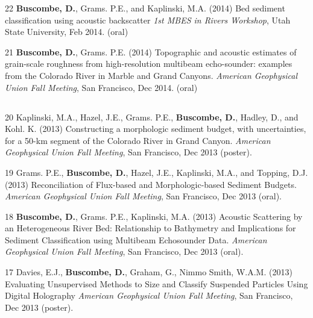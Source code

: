 \documentclass[margin,line]{resume}
\begin{document}
\begin{resume}
\begin{footnotesize}
\begin{list1}
        \item[22] {\bf Buscombe, D.}, Grams. P.E., and Kaplinski, M.A. (2014) Bed sediment classification using acoustic backscatter {\sl 1st MBES in Rivers Workshop}, Utah State University, Feb 2014. (oral)\\

        \item[21] {\bf Buscombe, D.}, Grams. P.E. (2014) Topographic and acoustic estimates of grain-scale roughness from high-resolution multibeam echo-sounder: examples from the Colorado River in Marble and Grand Canyons. {\sl American Geophysical Union Fall Meeting}, San Francisco, Dec 2014. (oral)
	\end{list1}
	
	\subsection{}
	\begin{list1}
	\item[20] Kaplinski, M.A., Hazel, J.E., Grams. P.E., {\bf Buscombe, D.}, Hadley, D., and Kohl. K. (2013) Constructing a morphologic sediment budget, with uncertainties, for a 50-km segment of the Colorado River in Grand Canyon.  {\sl American Geophysical Union Fall Meeting}, San Francisco, Dec 2013 (poster).\\

	\item[19] Grams. P.E., {\bf Buscombe, D.}, Hazel, J.E., Kaplinski, M.A., and Topping, D.J. (2013) Reconciliation of Flux-based and Morphologic-based Sediment Budgets. {\sl American Geophysical Union Fall Meeting}, San Francisco, Dec 2013 (oral). \\

	\item[18] {\bf Buscombe, D.}, Grams. P.E., Kaplinski, M.A. (2013) Acoustic Scattering by an Heterogeneous River Bed: Relationship to Bathymetry and Implications for Sediment Classification using Multibeam Echosounder Data. {\sl American Geophysical Union Fall Meeting}, San Francisco, Dec 2013 (oral). \\

	\item[17] Davies, E.J., {\bf Buscombe, D.}, Graham, G., Nimmo Smith, W.A.M. (2013) Evaluating Unsupervised Methods to Size and Classify Suspended Particles Using Digital Holography {\sl American Geophysical Union Fall Meeting}, San Francisco, Dec 2013 (poster). 
	\end{list1}


\end{footnotesize}
\end{resume}
\end{document}
